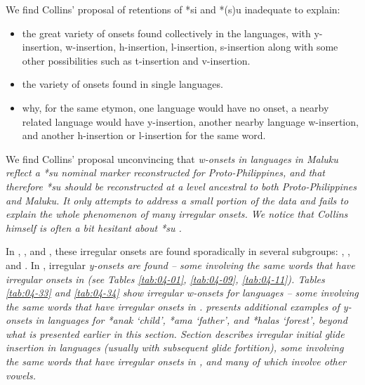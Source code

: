We find Collins’ proposal of retentions of *si
and *(s)u inadequate to explain:

\begin{itemize}
	\item	the great variety of onsets found collectively in the languages,
				with y-insertion, w-insertion, h-insertion, l-insertion, s-insertion
				along with some other possibilities such as t-insertion and v-insertion.
	\item	the variety of onsets found in single languages.
	\item	why, for the same etymon,
				one language would have no onset,
				a nearby related language would have y-insertion,
				another nearby language w-insertion,
				and another h-insertion or l-insertion for the same word.
\end{itemize}

We find Collins’ proposal unconvincing that \it{w}-onsets in
 languages in Maluku reflect a *su nominal marker
reconstructed for Proto-Philippines, and that therefore *su should be reconstructed at a level ancestral
to both Proto-Philippines and  Maluku.
It only attempts to address a small portion of the data
and fails to explain the whole phenomenon of many irregular onsets.
We notice that Collins himself is often a bit hesitant about *su \citep[130--131]{Collins1983}.

In , , and , these irregular
onsets are found sporadically in several subgroups: , , and .
In  , irregular \it{y}-onsets are found -- some
involving the same words that have irregular onsets in 
(see Tables \ref{tab:04-01}, \ref{tab:04-09}, \ref{tab:04-11}).
Tables \ref{tab:04-33} and \ref{tab:04-34} show irregular \it{w}-onsets for 
languages  -- some involving the same words
that have irregular onsets in .
 presents additional examples of \it{y}-onsets in
 languages for *anak ‘child’,
*ama ‘father’, and *halas ‘forest’, beyond what is presented
earlier in this section.
Section  describes irregular initial glide insertion
in  languages (usually with subsequent glide fortition),
some involving the same words that have irregular onsets in ,
and many of which involve other vowels.

